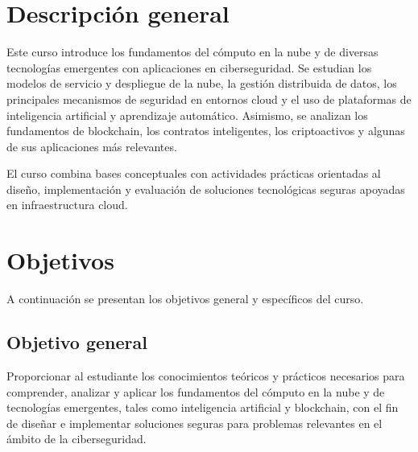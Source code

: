 \documentclass[
  coursetitle={Cómputo Nube y Tecnologías Emergentes},
  coursehours={96},
  coursedate={Verano 2026},
  doctype={Guía del curso},
  otherlangs={english,french},
  authorname={Lázaro},
  authorsurname={Bustio-Martínez},
  authortitle={PhD},
  role={Profesor Investigador},
  email={lbustio@inaoe.mx},
  phone={5559504000},
  ext={7459},
  institution={Instituto Nacional de Astrofísica, Óptica y Electrónica (INAOE)},
  department={Maestría en Ciencias en Tecnologías de Seguridad},
  address={Luis Enrique Erro 1, Sta. Ma. Tonantzintla, San Andrés Cholula, CP 72840, Puebla, México},
  margin={0.5in}
]{lbustio_lecture_notes}
\begin{document}
\IberoCover

\section{Descripción general}
\label{sec:descripcion}

Este curso introduce los fundamentos del cómputo en la nube y de diversas tecnologías emergentes con aplicaciones en ciberseguridad. Se estudian los modelos de servicio y despliegue de la nube, la gestión distribuida de datos, los principales mecanismos de seguridad en entornos cloud y el uso de plataformas de inteligencia artificial y aprendizaje automático. Asimismo, se analizan los fundamentos de blockchain, los contratos inteligentes, los criptoactivos y algunas de sus aplicaciones más relevantes.

El curso combina bases conceptuales con actividades prácticas orientadas al diseño, implementación y evaluación de soluciones tecnológicas seguras apoyadas en infraestructura cloud.

\section{Objetivos}
\label{sec:objetivos}

A continuación se presentan los objetivos general y específicos del curso.

\subsection{Objetivo general}
\label{sec:objetivo_general}

Proporcionar al estudiante los conocimientos teóricos y prácticos necesarios para comprender, analizar y aplicar los fundamentos del cómputo en la nube y de tecnologías emergentes, tales como inteligencia artificial y blockchain, con el fin de diseñar e implementar soluciones seguras para problemas relevantes en el ámbito de la ciberseguridad.
\end{document}
